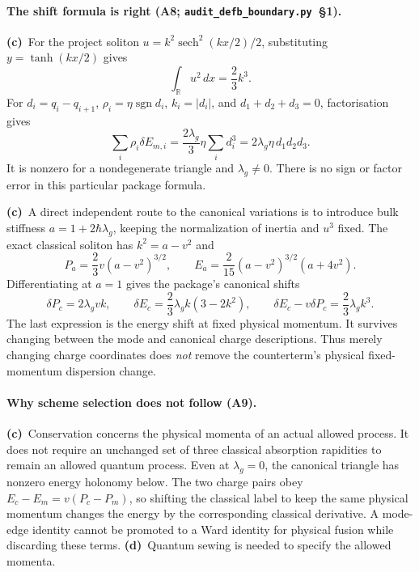 \documentclass[11pt,a4paper]{article}
\newcommand{\Lc}{\textbf{(c)}\ }
\newcommand{\Ld}{\textbf{(d)}\ }
\newcommand{\scr}{\texttt{audit\_\allowbreak defb\_\allowbreak boundary.py}}
\begin{document}
\paragraph{The shift formula is right (A8; \scr\ §1).}
\Lc For the project soliton $u=k^2\operatorname{sech}^2(kx/2)/2$,
substituting $y=\tanh(kx/2)$ gives
\begin{equation}
 \int_{\mathbb R}u^2\,dx=\frac23k^3.
\end{equation}
For $d_i=q_i-q_{i+1}$, $\rho_i=\eta\operatorname{sgn}d_i$,
$k_i=|d_i|$, and $d_1+d_2+d_3=0$, factorisation gives
\begin{equation}
 \sum_i\rho_i\delta E_{m,i}
 =\frac{2\lambda_g}{3}\eta\sum_i d_i^3
 =2\lambda_g\eta\,d_1d_2d_3.
 \label{eq:cubeshift}
\end{equation}
It is nonzero for a nondegenerate triangle and $\lambda_g\ne0$.
There is no sign or factor error in this particular package formula.

\Lc A direct independent route to the canonical variations is to introduce
bulk stiffness $a=1+2\hbar\lambda_g$, keeping the normalization of inertia
and $u^3$ fixed. The exact classical soliton has $k^2=a-v^2$ and
\begin{equation}
 P_a=\frac23v(a-v^2)^{3/2},\qquad
 E_a=\frac2{15}(a-v^2)^{3/2}(a+4v^2).
 \label{eq:stiffness}
\end{equation}
Differentiating at $a=1$ gives the package's canonical shifts
\begin{equation}
 \delta P_c=2\lambda_gvk,\qquad
 \delta E_c=\frac23\lambda_g k(3-2k^2),\qquad
 \delta E_c-v\delta P_c=\frac23\lambda_g k^3.
 \label{eq:countercharges}
\end{equation}
The last expression is the energy shift at fixed physical momentum. It
survives changing between the mode and canonical charge descriptions.
Thus merely changing charge coordinates does \emph{not} remove the
counterterm's physical fixed-momentum dispersion change.

\paragraph{Why scheme selection does not follow (A9).}
\Lc Conservation concerns the physical momenta of an actual allowed
process. It does not require an unchanged set of three classical
absorption rapidities to remain an allowed quantum process. Even at
$\lambda_g=0$, the canonical triangle has nonzero energy holonomy below.
The two charge pairs obey $E_c-E_m=v(P_c-P_m)$, so shifting the classical
label to keep the same physical momentum changes the energy by the
corresponding classical derivative. A mode-edge identity cannot be
promoted to a Ward identity for physical fusion while discarding these
terms. \Ld Quantum sewing is needed to specify the allowed momenta.
\end{document}
